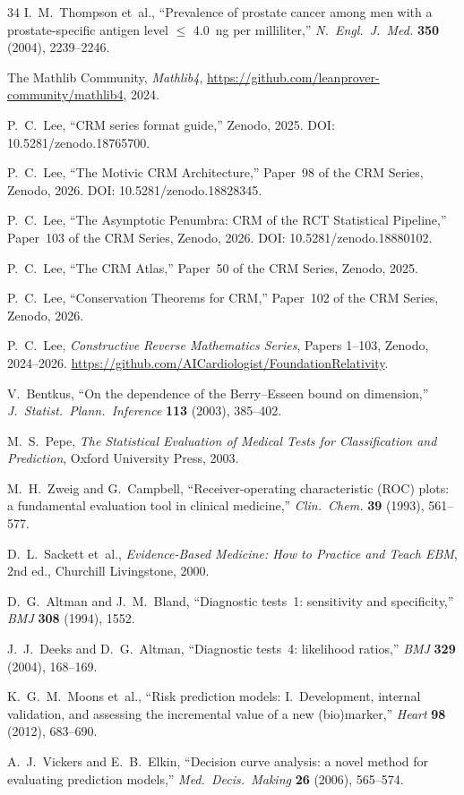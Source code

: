 \documentclass[11pt,a4paper]{article}
\theoremstyle{plain}
\theoremstyle{definition}
\begin{document}
\begin{thebibliography}{34}
I.~M.~Thompson et~al., ``Prevalence of prostate cancer among men with a prostate-specific antigen level $\leq$ 4.0~ng per milliliter,'' \emph{N.~Engl.~J.~Med.} \textbf{350} (2004), 2239--2246.

The Mathlib Community, \emph{Mathlib4}, \url{https://github.com/leanprover-community/mathlib4}, 2024.

P.~C.~Lee, ``CRM series format guide,'' Zenodo, 2025.  DOI: 10.5281/zenodo.18765700.

P.~C.~Lee, ``The Motivic CRM Architecture,'' Paper~98 of the CRM Series, Zenodo, 2026.  DOI: 10.5281/zenodo.18828345.

P.~C.~Lee, ``The Asymptotic Penumbra: CRM of the RCT Statistical Pipeline,'' Paper~103 of the CRM Series, Zenodo, 2026.  DOI: 10.5281/zenodo.18880102.

P.~C.~Lee, ``The CRM Atlas,'' Paper~50 of the CRM Series, Zenodo, 2025.

P.~C.~Lee, ``Conservation Theorems for CRM,'' Paper~102 of the CRM Series, Zenodo, 2026.

P.~C.~Lee, \emph{Constructive Reverse Mathematics Series}, Papers 1--103, Zenodo, 2024--2026.  \url{https://github.com/AICardiologist/FoundationRelativity}.

V.~Bentkus, ``On the dependence of the Berry--Esseen bound on dimension,'' \emph{J.~Statist.~Plann.~Inference} \textbf{113} (2003), 385--402.

M.~S.~Pepe, \emph{The Statistical Evaluation of Medical Tests for Classification and Prediction}, Oxford University Press, 2003.

M.~H.~Zweig and G.~Campbell, ``Receiver-operating characteristic (ROC) plots: a fundamental evaluation tool in clinical medicine,'' \emph{Clin.~Chem.} \textbf{39} (1993), 561--577.

D.~L.~Sackett et~al., \emph{Evidence-Based Medicine: How to Practice and Teach EBM}, 2nd ed., Churchill Livingstone, 2000.

D.~G.~Altman and J.~M.~Bland, ``Diagnostic tests~1: sensitivity and specificity,'' \emph{BMJ} \textbf{308} (1994), 1552.

J.~J.~Deeks and D.~G.~Altman, ``Diagnostic tests~4: likelihood ratios,'' \emph{BMJ} \textbf{329} (2004), 168--169.

K.~G.~M.~Moons et~al., ``Risk prediction models: I.\ Development, internal validation, and assessing the incremental value of a new (bio)marker,'' \emph{Heart} \textbf{98} (2012), 683--690.

A.~J.~Vickers and E.~B.~Elkin, ``Decision curve analysis: a novel method for evaluating prediction models,'' \emph{Med.~Decis.~Making} \textbf{26} (2006), 565--574.

\end{thebibliography}
\end{document}
